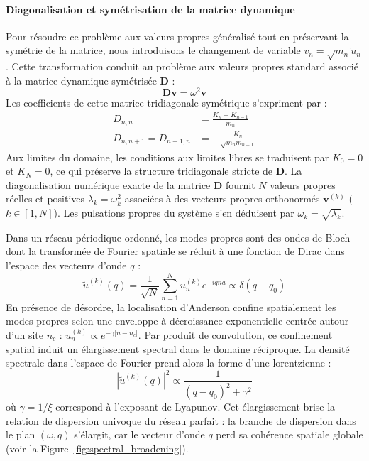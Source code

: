 \paragraph{Diagonalisation et symétrisation de la matrice dynamique}
Pour résoudre ce problème aux valeurs propres généralisé tout en préservant la symétrie de la matrice, nous introduisons le changement de variable $v_n = \sqrt{m_n} \tilde{u}_n$. Cette transformation conduit au problème aux valeurs propres standard associé à la matrice dynamique symétrisée $\mathbf{D}$ :
\begin{equation*}
    \mathbf{D} \mathbf{v} = \omega^2 \mathbf{v}
\end{equation*}
Les coefficients de cette matrice tridiagonale symétrique s'expriment par :
\begin{align*}
    D_{n, n} &= \frac{K_n + K_{n-1}}{m_n} \\
    D_{n, n+1} = D_{n+1, n} &= -\frac{K_n}{\sqrt{m_n m_{n+1}}}
\end{align*}
Aux limites du domaine, les conditions aux limites libres se traduisent par $K_0 = 0$ et $K_N = 0$, ce qui préserve la structure tridiagonale stricte de $\mathbf{D}$.
La diagonalisation numérique exacte de la matrice $\mathbf{D}$ fournit $N$ valeurs propres réelles et positives $\lambda_k = \omega_k^2$ associées à des vecteurs propres orthonormés $\mathbf{v}^{(k)}$ ($k \in [1, N]$). Les pulsations propres du système s'en déduisent par $\omega_k = \sqrt{\lambda_k}$.

Dans un réseau périodique ordonné, les modes propres sont des ondes de Bloch dont la transformée de Fourier spatiale se réduit à une fonction de Dirac dans l'espace des vecteurs d'onde $q$ :
\begin{equation*}
    \tilde{u}^{(k)}(q) = \frac{1}{\sqrt{N}} \sum_{n=1}^N u_n^{(k)} e^{-i q n a} \propto \delta(q - q_0)
\end{equation*}
En présence de désordre, la localisation d'Anderson confine spatialement les modes propres selon une enveloppe à décroissance exponentielle centrée autour d'un site $n_c$ : $u_n^{(k)} \propto e^{-\gamma |n - n_c|}$. Par produit de convolution, ce confinement spatial induit un élargissement spectral dans le domaine réciproque. La densité spectrale dans l'espace de Fourier prend alors la forme d'une lorentzienne :
\begin{equation*}
    \left| \tilde{u}^{(k)}(q) \right|^2 \propto \frac{1}{(q - q_0)^2 + \gamma^2}
\end{equation*}
où $\gamma = 1/\xi$ correspond à l'exposant de Lyapunov. Cet élargissement brise la relation de dispersion univoque du réseau parfait : la branche de dispersion dans le plan $(\omega, q)$ s'élargit, car le vecteur d'onde $q$ perd sa cohérence spatiale globale (voir la Figure~\ref{fig:spectral_broadening}).

